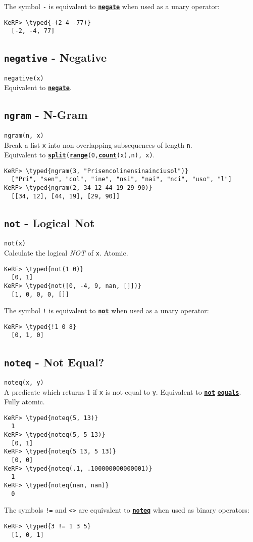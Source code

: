 \documentclass{article}
\newcommand{\typed}[1]{\textcolor{TealBlue}{#1}}
\newcommand{\primdefu}[3]{\subsection{\texttt{#1} - #2}\label{prim:#3}}
\newcommand{\primu}[2]{\hyperref[prim:#2]{\textbf{\texttt{#1}}}}
\newcommand{\primdef}[2]{\primdefu{#1}{#2}{#1}}
\newcommand{\prim}[1]{\primu{#1}{#1}}
\begin{document}
The symbol \texttt{-} is equivalent to \prim{negate} when used as a unary operator:
\begin{Verbatim}
KeRF> \typed{-(2 4 -77)}
  [-2, -4, 77]
\end{Verbatim}

\primdef{negative}{Negative}
\texttt{negative(x)}\\

Equivalent to \prim{negate}.

\primdef{ngram}{N-Gram}
\texttt{ngram(n, x)}\\

Break a list \texttt{x} into non-overlapping subsequences of length \texttt{n}.\\ Equivalent to \texttt{\prim{split}(\prim{range}(0,\prim{count}(x),n), x)}.

\begin{Verbatim}
KeRF> \typed{ngram(3, "Prisencolinensinainciusol")}
  ["Pri", "sen", "col", "ine", "nsi", "nai", "nci", "uso", "l"]
KeRF> \typed{ngram(2, 34 12 44 19 29 90)}
  [[34, 12], [44, 19], [29, 90]]
\end{Verbatim}

\primdef{not}{Logical Not}
\texttt{not(x)}\\

Calculate the logical \emph{NOT} of \texttt{x}. Atomic.
\begin{Verbatim}
KeRF> \typed{not(1 0)}
  [0, 1]
KeRF> \typed{not([0, -4, 9, nan, []])}
  [1, 0, 0, 0, []]
\end{Verbatim}

The symbol \texttt{!} is equivalent to \prim{not} when used as a unary operator:
\begin{Verbatim}
KeRF> \typed{!1 0 8}
  [0, 1, 0]
\end{Verbatim}

\primdef{noteq}{Not Equal?}
\texttt{noteq(x, y)}\\

A predicate which returns 1 if \texttt{x} is not equal to \texttt{y}. Equivalent to \prim{not} \prim{equals}. Fully atomic.
\begin{Verbatim}
KeRF> \typed{noteq(5, 13)}
  1
KeRF> \typed{noteq(5, 5 13)}
  [0, 1]
KeRF> \typed{noteq(5 13, 5 13)}
  [0, 0]
KeRF> \typed{noteq(.1, .100000000000001)}
  1
KeRF> \typed{noteq(nan, nan)}
  0
\end{Verbatim}

The symbols \texttt{!=} and \texttt{<>} are equivalent to \prim{noteq} when used as binary operators:
\begin{Verbatim}
KeRF> \typed{3 != 1 3 5}
  [1, 0, 1]
\end{Verbatim}
\end{document}
